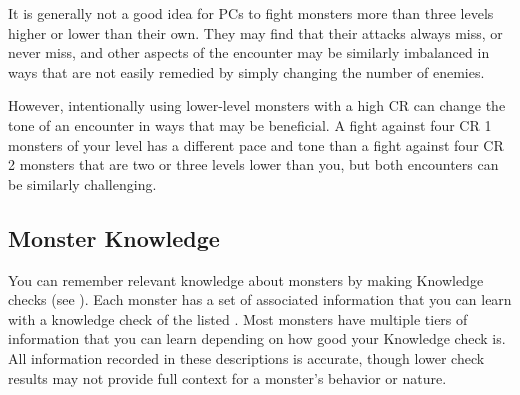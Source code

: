         It is generally not a good idea for PCs to fight monsters more than three levels higher or lower than their own.
        They may find that their attacks always miss, or never miss, and other aspects of the encounter may be similarly imbalanced in ways that are not easily remedied by simply changing the number of enemies.

        However, intentionally using lower-level monsters with a high CR can change the tone of an encounter in ways that may be beneficial.
        A fight against four CR 1 monsters of your level has a different pace and tone than a fight against four CR 2 monsters that are two or three levels lower than you, but both encounters can be similarly challenging.

    \subsection{Monster Knowledge}
        You can remember relevant knowledge about monsters by making Knowledge checks (see ).
        Each monster has a set of associated information that you can learn with a knowledge check of the listed .
        Most monsters have multiple tiers of information that you can learn depending on how good your Knowledge check is.
        All information recorded in these descriptions is accurate, though lower check results may not provide full context for a monster's behavior or nature.



